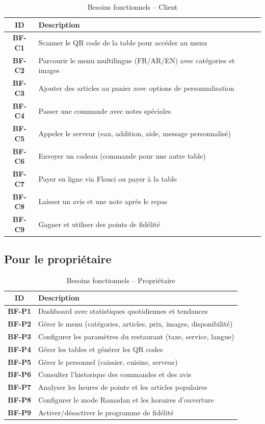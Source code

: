 \documentclass[12pt,a4paper]{report}
\begin{document}
\begin{table}[H]
    \centering
    \caption{Besoins fonctionnels -- Client}
    \label{tab:bf-client}
    \begin{tabularx}{\textwidth}{>{\bfseries}cp{}}
        \toprule
        \textbf{ID} & \textbf{Description} \\
        \midrule
        BF-C1 & Scanner le QR code de la table pour accéder au menu \\
        BF-C2 & Parcourir le menu multilingue (FR/AR/EN) avec catégories et images \\
        BF-C3 & Ajouter des articles au panier avec options de personnalisation \\
        BF-C4 & Passer une commande avec notes spéciales \\
        BF-C5 & Appeler le serveur (eau, addition, aide, message personnalisé) \\
        BF-C6 & Envoyer un cadeau (commande pour une autre table) \\
        BF-C7 & Payer en ligne via Flouci ou payer à la table \\
        BF-C8 & Laisser un avis et une note après le repas \\
        BF-C9 & Gagner et utiliser des points de fidélité \\
        \bottomrule
    \end{tabularx}
\end{table}

\subsection{Pour le propriétaire}

\begin{table}[H]
    \centering
    \caption{Besoins fonctionnels -- Propriétaire}
    \label{tab:bf-owner}
    \begin{tabularx}{\textwidth}{>{\bfseries}cp{}}
        \toprule
        \textbf{ID} & \textbf{Description} \\
        \midrule
        BF-P1 & Dashboard avec statistiques quotidiennes et tendances \\
        BF-P2 & Gérer le menu (catégories, articles, prix, images, disponibilité) \\
        BF-P3 & Configurer les paramètres du restaurant (taxe, service, langue) \\
        BF-P4 & Gérer les tables et générer les QR codes \\
        BF-P5 & Gérer le personnel (caissier, cuisine, serveur) \\
        BF-P6 & Consulter l'historique des commandes et des avis \\
        BF-P7 & Analyser les heures de pointe et les articles populaires \\
        BF-P8 & Configurer le mode Ramadan et les horaires d'ouverture \\
        BF-P9 & Activer/désactiver le programme de fidélité \\
        \bottomrule
    \end{tabularx}
\end{table}
\end{document}
